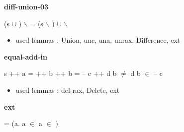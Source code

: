 \documentclass[a4paper]{article}
\begin{document}
\medskip

\bigskip

{\large\bf diff-union-03}

\medskip

 \Fol (s $\cup$ ) $\backslash$  = (s $\backslash$ ) $\cup$  $\backslash$ 

\begin{itemize}


\item       used lemmas  : Union, unc, una, unrax, Difference, ext

\end{itemize}

\medskip

\bigskip

{\large\bf equal-add-in}

\medskip

 \Fol s ++ a =  ++ b \And {} ++ b =  -- c ++ d \And b $\neq$ d \Imp b $\in$  -- c

\begin{itemize}


\item       used lemmas  : del-rax, Delete, ext

\end{itemize}

\medskip

\bigskip

{\large\bf ext}

\medskip

 \Fol {} =  \Equiv (\All a. a $\in$  \Equiv a $\in$ )
\end{document}
